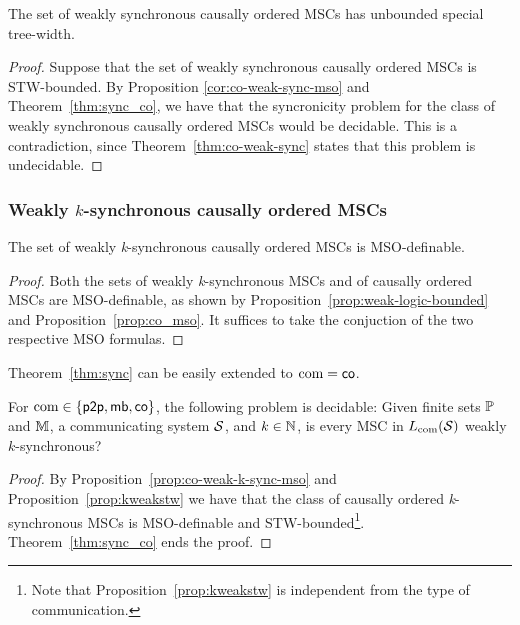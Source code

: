 \documentclass{article}
\begin{document}
\begin{corollary}
The set of weakly synchronous causally ordered MSCs has unbounded special tree-width.
\end{corollary}
\begin{proof}
Suppose that the set of weakly synchronous causally ordered MSCs is STW-bounded. By Proposition \ref{cor:co-weak-sync-mso} and Theorem~\ref{thm:sync_co}, we have that the syncronicity problem for the class of weakly synchronous causally ordered MSCs would be decidable. This is a contradiction, since Theorem~\ref{thm:co-weak-sync} states that this problem is undecidable.
\end{proof}

\subsubsection{Weakly \texorpdfstring{$k$}{k}-synchronous causally ordered MSCs} 

\begin{proposition}\label{prop:co-weak-k-sync-mso}
The set of weakly \emph{k}-synchronous causally ordered MSCs is MSO-definable.
\end{proposition}
\begin{proof}
Both the sets of weakly \emph{k}-synchronous MSCs and of causally ordered MSCs are MSO-definable, as shown by Proposition~\ref{prop:weak-logic-bounded} and Proposition~\ref{prop:co_mso}. It suffices to take the conjuction of the two respective MSO formulas.
\end{proof}

Theorem~\ref{thm:sync} can be easily extended to $\textup{com} = \mathsf{co}$.

\begin{theorem}\label{thm:co-weak-k-sync}
For $\textup{com} \in \{\mathsf{p2p}, \mathsf{mb},\mathsf{co}\}$, the following problem is decidable:
Given finite sets $\mathbb{P}$ and $\mathbb{M}$, a communicating system $\mathcal{S}$, and $k \in \mathbb{N}$,
is every MSC in $L_{\textup{com}}(\mathcal{S})$ weakly $k$-synchronous?
\end{theorem}
\begin{proof}
By Proposition~\ref{prop:co-weak-k-sync-mso} and Proposition~\ref{prop:kweakstw} we have that the class of causally ordered \emph{k}-synchronous MSCs is MSO-definable and STW-bounded\footnote{Note that Proposition~\ref{prop:kweakstw} is independent from the type of communication.}. Theorem~\ref{thm:sync_co} ends the proof.
\end{proof}
\end{document}
